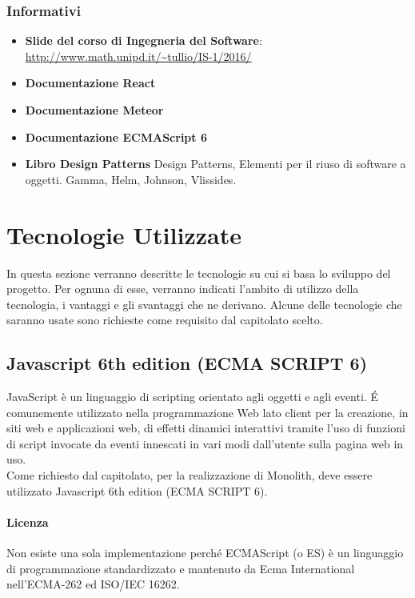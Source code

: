 \subsubsection{Informativi}
\begin{itemize}
	\item \textbf{Slide del corso di Ingegneria del Software}:
     \\  \url{http://www.math.unipd.it/~tullio/IS-1/2016/ }
\item \textbf{Documentazione React}
\item \textbf{Documentazione Meteor}
\item \textbf{Documentazione ECMAScript 6} 
\item \textbf{Libro Design Patterns} Design Patterns, Elementi per il
  riuso di software a oggetti. Gamma, Helm, Johnson, Vlissides.

\end{itemize}

\section{Tecnologie Utilizzate}

In questa sezione verranno descritte le tecnologie su cui si basa lo
sviluppo del progetto. Per ognuna di esse, verranno indicati l’ambito
di utilizzo della tecnologia, i vantaggi e gli svantaggi che ne
derivano. Alcune delle tecnologie che saranno usate sono richieste come requisito dal capitolato scelto.

\subsection{Javascript 6th edition (ECMA SCRIPT 6)}

JavaScript è un linguaggio di scripting orientato agli oggetti e agli
eventi. \'E comunemente utilizzato nella programmazione Web lato
client per la creazione, in siti web e applicazioni web, di effetti
dinamici interattivi tramite l'uso di funzioni di script invocate da
eventi innescati in vari modi dall'utente sulla pagina web in
uso. \\ Come richiesto dal capitolato, per la realizzazione di
Monolith, deve essere utilizzato Javascript 6th edition (ECMA SCRIPT
6). \\ 

\paragraph{Licenza}  
Non esiste una sola implementazione perché ECMAScript (o ES) è un
linguaggio di programmazione standardizzato e mantenuto da Ecma
International nell'ECMA-262 ed ISO/IEC 16262. \\


